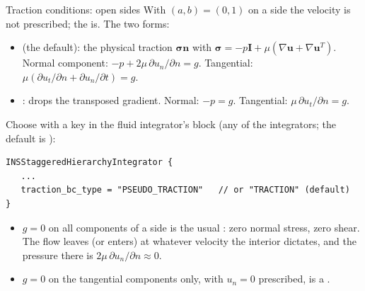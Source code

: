 \documentclass[aspectratio=169,11pt]{beamer}
\begin{document}
\begin{frame}[fragile]{Traction conditions: open sides}
\label{fr:traction}
\small With $(a, b) = (0, 1)$ on a side the velocity is not prescribed; the  is. The two forms:
\begin{itemize}
  \item {} (the default): the physical traction $\boldsymbol{\sigma}\mathbf{n}$ with $\boldsymbol{\sigma} = -p\mathbf{I} + \mu(\nabla\mathbf{u} + \nabla\mathbf{u}^T)$. Normal component: $-p + 2\mu\,\partial u_n/\partial n = g$. Tangential: $\mu(\partial u_t/\partial n + \partial u_n/\partial t) = g$.
  \item {}: drops the transposed gradient. Normal: $-p = g$. Tangential: $\mu\,\partial u_t/\partial n = g$.
\end{itemize}
Choose with a key in the fluid integrator's block (any of the integrators; the default is ):
\begin{lstlisting}[style=input]
INSStaggeredHierarchyIntegrator {
   ...
   traction_bc_type = "PSEUDO_TRACTION"   // or "TRACTION" (default)
}
\end{lstlisting}
\begin{itemize}
  \item $g = 0$ on all components of a side is the usual : zero normal stress, zero shear. The flow leaves (or enters) at whatever velocity the interior dictates, and the pressure there is $2\mu\,\partial u_n/\partial n \approx 0$.
  \item $g = 0$ on the tangential components only, with $u_n = 0$ prescribed, is a .
\end{itemize}
\end{frame}
\end{document}
